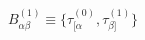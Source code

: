 \begin{equation}
  B_{\alpha\beta}^{(1)}\equiv \{\tau_{[\alpha}^{(0)},
  \tau_{\beta]}^{(1)}\}
  \label{b10}
  \end{equation}

